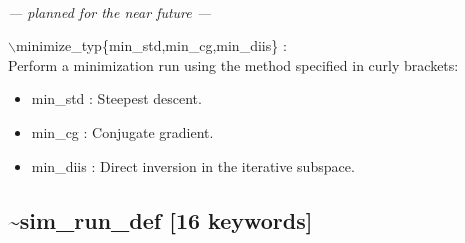 \documentclass[12pt,titlepage]{article}
\begin{document}
\begin{enumerate}
~\\


 \vspace{0.15in} 
{\it
--- planned for the near future ---
 \item  $\backslash$minimize\_typ\{min\_std,min\_cg,min\_diis\} : \\
     Perform a minimization run using the method specified in curly brackets:
     \begin{itemize}
        \item min\_std : Steepest descent.
        \item min\_cg : Conjugate gradient.
        \item min\_diis : Direct inversion in the 
                                          iterative subspace.
     \end{itemize}
}

\end{enumerate}


\newpage
\subsection*{\bf \~{}sim\_run\_def [16 keywords]}
\end{document}
